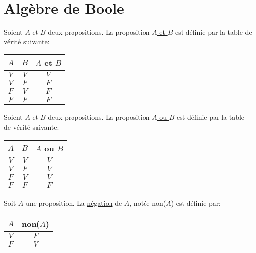 \part{Algèbre de Boole}

\begin{defn}
	Soient $A$ et $B$ deux propositions. La proposition \underline{$A$ et $B$} est définie par la table de vérité suivante:\\
	\begin{center}
		\begin{tabular}
			{c|c|c}
			$A$&$B$&$A$ et $B$ \\ \hline
			$V$&$V$&$V$ \\ \hline
			$V$&$F$&$F$ \\ \hline
			$F$&$V$&$F$ \\ \hline
			$F$&$F$&$F$ \\
		\end{tabular}
	\end{center}
\end{defn}

\begin{defn}
	Soient $A$ et $B$ deux propositions. La proposition \underline{$A$ ou $B$} est définie par la table de vérité suivante:\\
	\begin{center}
		\begin{tabular}
			{c|c|c}
			$A$&$B$&$A$ ou $B$ \\ \hline
			$V$&$V$&$V$ \\ \hline
			$V$&$F$&$V$ \\ \hline
			$F$&$V$&$V$ \\ \hline
			$F$&$F$&$F$ \\
		\end{tabular}
	\end{center}
\end{defn}

\begin{defn}
	Soit $A$ une proposition. La \underline{négation} de $A$, notée non($A$) est définie par:\\
	\begin{center}
		\begin{tabular}
			{c|c}
			$A$ &non($A$)\\ \hline
			$V$ & $F$\\ \hline
			$F$ & $V$\\
		\end{tabular}
	\end{center}
\end{defn}

